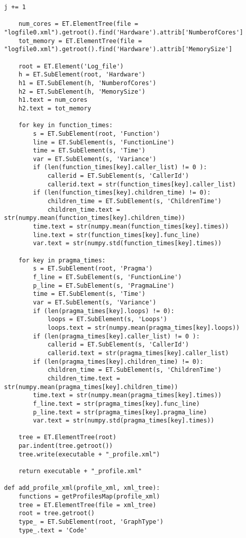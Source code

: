 \documentclass[a4paper,10pt,twoside]{book}
\begin{document}
\begin{lstlisting}[language=CCC, caption=profiler.py]
		j += 1

	num_cores = ET.ElementTree(file = "logfile0.xml").getroot().find('Hardware').attrib['NumberofCores']
	tot_memory = ET.ElementTree(file = "logfile0.xml").getroot().find('Hardware').attrib['MemorySize']

	root = ET.Element('Log_file')
	h = ET.SubElement(root, 'Hardware')
	h1 = ET.SubElement(h, 'NumberofCores')
	h2 = ET.SubElement(h, 'MemorySize')
	h1.text = num_cores
	h2.text = tot_memory

	for key in function_times:
		s = ET.SubElement(root, 'Function')
		line = ET.SubElement(s, 'FunctionLine')
		time = ET.SubElement(s, 'Time')
		var = ET.SubElement(s, 'Variance')
		if (len(function_times[key].caller_list) != 0 ):
			callerid = ET.SubElement(s, 'CallerId')
			callerid.text = str(function_times[key].caller_list)
		if (len(function_times[key].children_time) != 0):
			children_time = ET.SubElement(s, 'ChildrenTime')
			children_time.text = str(numpy.mean(function_times[key].children_time))
		time.text = str(numpy.mean(function_times[key].times))
		line.text = str(function_times[key].func_line)
		var.text = str(numpy.std(function_times[key].times))

	for key in pragma_times:
		s = ET.SubElement(root, 'Pragma')
		f_line = ET.SubElement(s, 'FunctionLine')
		p_line = ET.SubElement(s, 'PragmaLine')
		time = ET.SubElement(s, 'Time')
		var = ET.SubElement(s, 'Variance')
		if (len(pragma_times[key].loops) != 0):
			loops = ET.SubElement(s, 'Loops')
			loops.text = str(numpy.mean(pragma_times[key].loops))
		if (len(pragma_times[key].caller_list) != 0 ):
			callerid = ET.SubElement(s, 'CallerId')
			callerid.text = str(pragma_times[key].caller_list)
		if (len(pragma_times[key].children_time) != 0):
			children_time = ET.SubElement(s, 'ChildrenTime')
			children_time.text = str(numpy.mean(pragma_times[key].children_time))
		time.text = str(numpy.mean(pragma_times[key].times))
		f_line.text = str(pragma_times[key].func_line)
		p_line.text = str(pragma_times[key].pragma_line)
		var.text = str(numpy.std(pragma_times[key].times))

	tree = ET.ElementTree(root)
	par.indent(tree.getroot())
	tree.write(executable + "_profile.xml")

	return executable + "_profile.xml"

def add_profile_xml(profile_xml, xml_tree):
	functions = getProfilesMap(profile_xml)
	tree = ET.ElementTree(file = xml_tree) 
	root = tree.getroot()
	type_ = ET.SubElement(root, 'GraphType')
	type_.text = 'Code'


\end{lstlisting}
\end{document}
